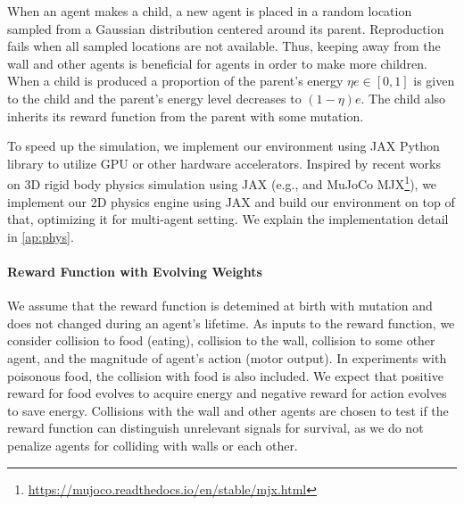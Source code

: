 When an agent makes a child, a new agent is placed in a random location sampled from a Gaussian distribution centered around its parent. %
Reproduction fails when all
sampled locations are not available. Thus, keeping away from the wall and other agents is beneficial for agents in order to make more children. When a child is produced
a proportion of the parent's energy $\eta e \in [0, 1]$ is given to the child and the parent's energy level decreases to $(1-\eta)e$.
The child also inherits its reward function from the parent with some mutation.

To speed up the simulation, we implement our environment using JAX Python library \citep{jax2018github} to utilize GPU or other hardware accelerators. Inspired by recent works on 3D rigid body physics simulation using JAX (e.g., \citet{brax2021github} and MuJoCo \citep{todorov2012mujoco} MJX\footnote{\url{https://mujoco.readthedocs.io/en/stable/mjx.html}}), we implement our 2D physics engine using JAX and build our environment on top of that, optimizing it for multi-agent setting. We explain the implementation detail in \cref{ap:phys}.

\paragraph{Reward Function with Evolving Weights} %
We assume that the reward function is detemined at birth with mutation and does not changed during an agent's lifetime. As inputs to the reward function, we consider  collision to food (eating),  collision to the wall,  collision to some other agent, and  the magnitude of agent's action (motor output). In experiments with poisonous food, the collision with food is also included. 
We expect that positive reward for food evolves to acquire energy
and negative reward for action  evolves to save energy. Collisions with the wall and other agents are chosen to test if the reward function can distinguish unrelevant signals for survival, as we do not penalize agents for colliding with walls or each other.

